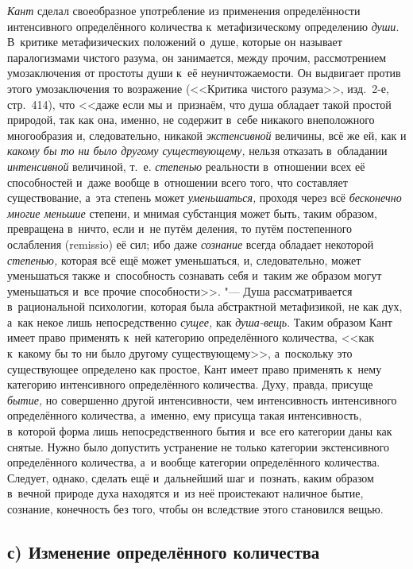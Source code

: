 {\em Кант} сделал своеобразное употребление из применения определённости
интенсивного определённого количества к~метафизическому определению {\em души}.
В~критике метафизических положений о~душе, которые он называет паралогизмами
чистого разума, он занимается, между прочим, рассмотрением умозаключения от
простоты души к~её неуничтожаемости. Он выдвигает против этого умозаключения то
возражение (<<Критика чистого разума>>, изд.~2-е, стр.~414), что <<даже если мы
и~признаём, что душа обладает такой простой природой, так как она, именно, не
содержит в~себе никакого внеположного многообразия и, следовательно, никакой
{\em экстенсивной} величины, всё же ей, как и {\em какому бы то ни было другому
существующему,} нельзя отказать в~обладании {\em интенсивной} величиной, т.~е.
{\em степенью} реальности в~отношении всех её способностей и~даже вообще
в~отношении всего того, что составляет существование, а~эта степень может
{\em уменьшаться,} проходя через всё {\em бесконечно многие меньшие} степени, и
мнимая субстанция может быть, таким образом, превращена в~ничто, если и~не
путём деления, то путём постепенного ослабления (remissio) её сил; ибо даже
{\em сознание} всегда обладает некоторой {\em степенью,} которая всё ещё может
уменьшаться, и, следовательно, может уменьшаться также и~способность сознавать
себя и~таким же образом могут уменьшаться и~все прочие способности>>. "--- Душа
рассматривается в~рациональной психологии, которая была абстрактной
метафизикой, не как дух, а~как некое лишь непосредственно {\em сущее,} как
{\em душа-вещь}. Таким образом Кант имеет право применять к~ней категорию
определённого количества, <<как к~какому бы то ни было другому существующему>>,
а~поскольку это существующее определено как простое, Кант имеет право применять
к~нему категорию интенсивного определённого количества. Духу, правда, присуще
{\em бытие,} но совершенно другой интенсивности, чем интенсивность интенсивного
определённого количества, а~именно, ему присуща такая интенсивность, в~которой
форма лишь непосредственного бытия и~все его категории даны как снятые. Нужно
было допустить устранение не только категории экстенсивного определённого
количества, а~и вообще категории определённого количества. Следует, однако,
сделать ещё и~дальнейший шаг и~познать, каким образом в~вечной природе духа
находятся и~из неё проистекают наличное бытие, сознание, конечность без того,
чтобы он вследствие этого становился вещью.

\subsection[с) Изменение определённого количества]%
{с) Изменение определённого количества}

